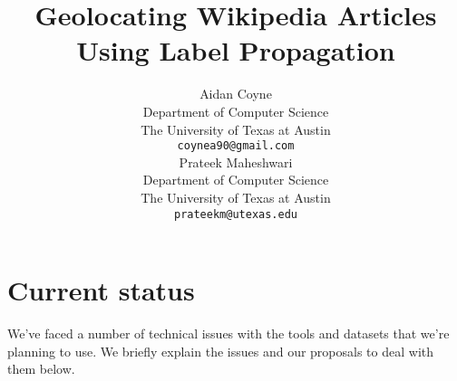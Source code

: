 \documentclass[11pt]{article}
\title{Geolocating Wikipedia Articles Using Label Propagation}
\author{
  Aidan Coyne \\
    Department of Computer Science\\
    The University of Texas at Austin\\
  {\tt coynea90@gmail.com} \\ 
  \And
  Prateek Maheshwari\\
    Department of Computer Science\\
    The University of Texas at Austin\\
  {\tt prateekm@utexas.edu}
}
\date{}
\begin{document}
\maketitle





\section{Current status}
We've faced a number of technical issues with the tools and datasets that we're planning to use. We briefly explain the issues and our proposals to deal with them below.













\end{document}
